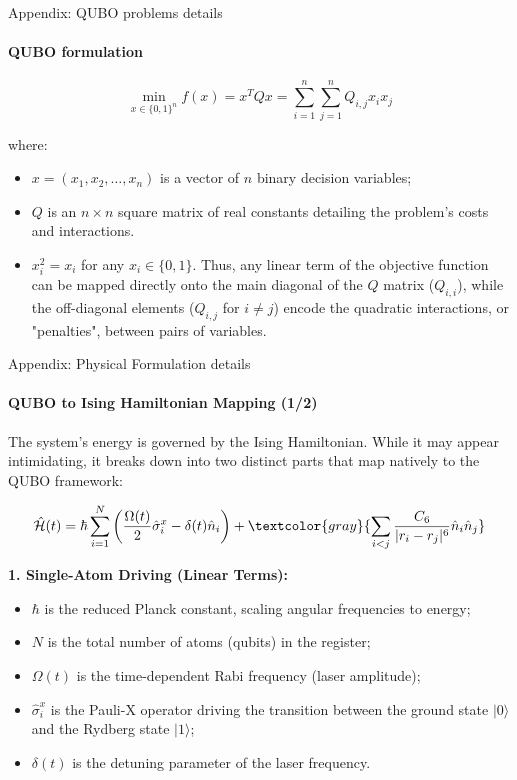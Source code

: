 \documentclass[10pt, aspectratio=169]{beamer}
\begin{document}
\begin{frame}{Appendix: QUBO problems details}
    \framesubtitle{QUBO formulation}
    
\begin{equation}
    \min_{x \in \{0,1\}^n} f(x) = x^T Q x = \sum_{i=1}^{n} \sum_{j=1}^{n} Q_{i,j} x_i x_j
\end{equation}

where:
\begin{itemize}
    \item $x = (x_1, x_2, \dots, x_n)$ is a vector of $n$ binary decision variables;
    \item $Q$ is an $n \times n$ square matrix of real constants detailing the problem's costs and interactions.
    \item $x_i^2 = x_i$ for any $x_i \in \{0,1\}$. Thus, any linear term of the objective function can be mapped directly onto the main diagonal of the $Q$ matrix ($Q_{i,i}$), while the off-diagonal elements ($Q_{i,j}$ for $i \neq j$) encode the quadratic interactions, or "penalties", between pairs of variables.

\end{itemize}

\end{frame}

\begin{frame}{Appendix: Physical Formulation details}
\framesubtitle{QUBO to Ising Hamiltonian Mapping (1/2)}
    The system's energy is governed by the Ising Hamiltonian. While it may appear intimidating, it breaks down into two distinct parts that map natively to the QUBO framework: 
    
    \begin{equation}
    \hat{\mathcal{H}}(t) = \hbar\sum_{i=1}^{N}\left(\frac{\Omega(t)}{2}\hat{\sigma}_{i}^{x}-\delta(t)\hat{n}_{i}\right) + \textcolor{gray}{\sum_{i<j}\frac{C_{6}}{|r_{i}-r_{j}|^{6}}\hat{n}_{i}\hat{n}_{j}}
    \end{equation}

    \vspace{0.2cm}
    \textbf{1. Single-Atom Driving (Linear Terms):}
    \begin{itemize}
        \item $\hbar$ is the reduced Planck constant, scaling angular frequencies to energy;
        \item $N$ is the total number of atoms (qubits) in the register;
        \item $\Omega(t)$ is the time-dependent Rabi frequency (laser amplitude);
        \item $\hat{\sigma}_{i}^{x}$ is the Pauli-X operator driving the transition between the ground state $|0\rangle$ and the Rydberg state $|1\rangle$;
        \item $\delta(t)$ is the detuning parameter of the laser frequency.
    \end{itemize}
\end{frame}
\end{document}
